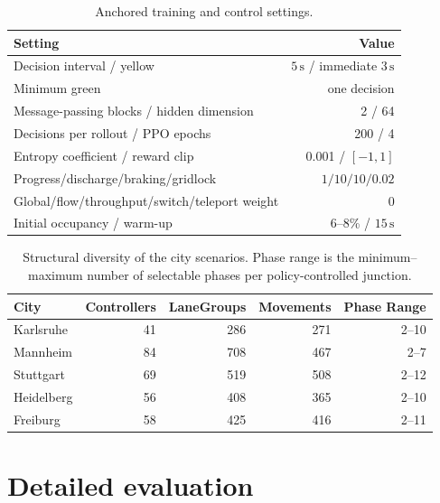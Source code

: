 \documentclass[10pt,a4paper]{article}
\begin{document}
\begin{table}[H]
  \centering
  \caption{Anchored training and control settings.}
  \begin{tabular}{@{}lr@{}}
    \toprule
    Setting & Value\\
    \midrule
    Decision interval / yellow & \(5\,\mathrm{s}\) / immediate \(3\,\mathrm{s}\)\\
    Minimum green & one decision\\
    Message-passing blocks / hidden dimension & 2 / 64\\
    Decisions per rollout / PPO epochs & 200 / 4\\
    Entropy coefficient / reward clip & 0.001 / \([-1,1]\)\\
    Progress/discharge/braking/gridlock & \(1/10/10/0.02\)\\
    Global/flow/throughput/switch/teleport weight & 0\\
    Initial occupancy / warm-up & 6--8\% / \(15\,\mathrm{s}\)\\
    \bottomrule
  \end{tabular}
  \label{tab:settings}
\end{table}

\begin{table}[H]
  \centering
  \caption{Structural diversity of the city scenarios. Phase range is the minimum--maximum number of selectable phases per policy-controlled junction.}
  \begin{tabular}{@{}lrrrr@{}}
    \toprule
    City & Controllers & LaneGroups & Movements & Phase Range\\
    \midrule
    Karlsruhe & 41 & 286 & 271 & 2--10\\
    Mannheim & 84 & 708 & 467 & 2--7\\
    Stuttgart & 69 & 519 & 508 & 2--12\\
    Heidelberg & 56 & 408 & 365 & 2--10\\
    Freiburg & 58 & 425 & 416 & 2--11\\
    \bottomrule
  \end{tabular}
  \label{tab:city-structure}
\end{table}

\section{Detailed evaluation}
\end{document}

